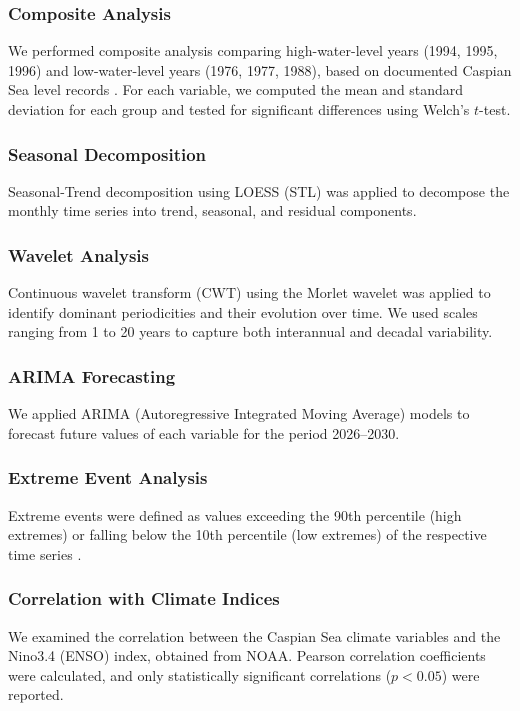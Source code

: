 \documentclass[12pt,a4paper]{article}
\begin{document}
\subsubsection{Composite Analysis}
We performed composite analysis comparing high-water-level years (1994, 1995, 1996) and low-water-level years (1976, 1977, 1988), based on documented Caspian Sea level records \citep{arpad2006}. For each variable, we computed the mean and standard deviation for each group and tested for significant differences using Welch's $t$-test.

\subsubsection{Seasonal Decomposition}
Seasonal-Trend decomposition using LOESS (STL) \citep{cleveland1990} was applied to decompose the monthly time series into trend, seasonal, and residual components.

\subsubsection{Wavelet Analysis}
Continuous wavelet transform (CWT) using the Morlet wavelet \citep{torrence1998} was applied to identify dominant periodicities and their evolution over time. We used scales ranging from 1 to 20 years to capture both interannual and decadal variability.

\subsubsection{ARIMA Forecasting}
We applied ARIMA (Autoregressive Integrated Moving Average) models \citep{box1976} to forecast future values of each variable for the period 2026–2030.

\subsubsection{Extreme Event Analysis}
Extreme events were defined as values exceeding the 90th percentile (high extremes) or falling below the 10th percentile (low extremes) of the respective time series \citep{zhang2011}.

\subsubsection{Correlation with Climate Indices}
We examined the correlation between the Caspian Sea climate variables and the Nino3.4 (ENSO) index, obtained from NOAA. Pearson correlation coefficients were calculated, and only statistically significant correlations ($p<0.05$) were reported.
\end{document}
